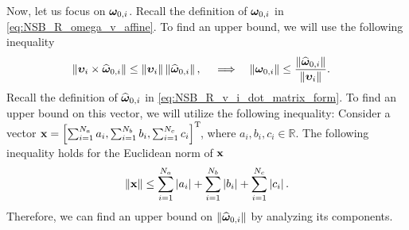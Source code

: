 Now, let us focus on $\bm{\omega}_{0, i}$.
Recall the definition of $\bm{\omega}_{0, i}$ in \eqref{eq:NSB_R_omega_v_affine}.
To find an upper bound, we will use the following inequality
\begin{align}
    \left\|\bm{\upsilon}_i \times \widehat{\bm{\omega}}_{0, i}\right\| &\leq \left\|\bm{\upsilon}_i\right\|\left\|\widehat{\bm{\omega}}_{0, i}\right\|, &
    & \implies &
    \left\|\bm{\omega}_{0, i}\right\| &\leq \frac{\left\|\widehat{\bm{\omega}}_{0, i}\right\|}{\left\|\bm{\upsilon}_i\right\|}.
\end{align}
Recall the definition of $\widehat{\bm{\omega}}_{0, i}$ in \eqref{eq:NSB_R_v_i_dot_matrix_form}.
To find an upper bound on this vector, we will utilize the following inequality:
Consider a vector $\mathbf{x} = \left[\sum_{i=1}^{N_a} a_i, \sum_{i=1}^{N_b} b_i, \sum_{i=1}^{N_c} c_i\right]^{\mathrm{T}}\!$, where $a_i, b_i, c_i \in \mathbb{R}$.
The following inequality holds for the Euclidean norm of $\mathbf{x}$
\begin{equation}
    \left\|\mathbf{x}\right\| \leq \sum_{i=1}^{N_a} \left|a_i\right| + \sum_{i=1}^{N_b} \left|b_i\right| + \sum_{i=1}^{N_c} \left|c_i\right|.
\end{equation}
Therefore, we can find an upper bound on $\left\|\widehat{\bm{\omega}}_{0, i}\right\|$ by analyzing its components.

